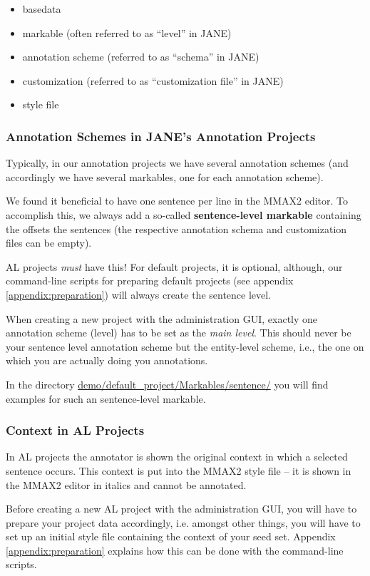 \documentclass[DIV12,english,11pt,halfparskip]{scrartcl}
\begin{document}
\begin{appendix}
\begin{itemize}
\item basedata
\item markable (often referred to as ``level'' in JANE)
\item annotation scheme (referred to as ``schema'' in JANE)
\item customization (referred to as ``customization file'' in JANE)
\item style file
\end{itemize}


\subsubsection{Annotation Schemes in JANE's Annotation Projects}

Typically, in our annotation projects we have several annotation
schemes (and accordingly we have several markables, one for each
annotation scheme).

We found it beneficial to have one sentence per line in the MMAX2
editor. To accomplish this, we always add a so-called
\textbf{sentence-level markable} containing the offsets the sentences
(the respective annotation schema and customization files can be
empty).

AL projects \emph{must} have this! For default projects, it is
optional, although, our command-line scripts for preparing default
projects (see appendix \ref{appendix:preparation}) will always create
the sentence level.

When creating a new project with the administration GUI, exactly one
annotation scheme (level) has to be set as the \emph{main level}.
This should never be your sentence level annotation scheme but the
entity-level scheme, i.e., the one on which you are actually doing you
annotations.

In the directory \url{demo/default_project/Markables/sentence/} you
will find examples for such an sentence-level markable.



\subsubsection{Context in AL Projects}
In AL projects the annotator is shown the original context in which a
selected sentence occurs. This context is put into the MMAX2 style
file -- it is shown in the MMAX2 editor in italics and cannot be
annotated.

Before creating a new AL project with the administration GUI, you will
have to prepare your project data accordingly, i.e. amongst other
things, you will have to set up an initial style file containing the
context of your seed set. Appendix \ref{appendix:preparation} explains
how this can be done with the command-line scripts.



\end{appendix}
\end{document}
